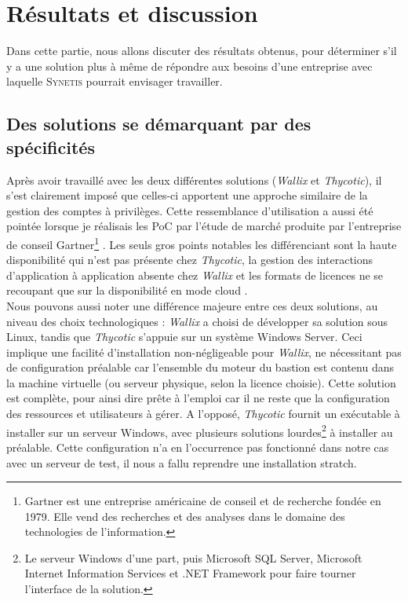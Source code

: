 \section{Résultats et discussion}
\label{sec:resultats}

Dans cette partie, nous allons discuter des résultats obtenus, pour déterminer s'il y a une solution plus à même de répondre aux besoins d'une entreprise avec laquelle \textsc{Synetis} pourrait envisager travailler.

\subsection{Des solutions se démarquant par des spécificités}
\label{subsec:soltaille}

Après avoir travaillé avec les deux différentes solutions (\emph{Wallix} et \emph{Thycotic}), il s'est clairement imposé que celles-ci apportent une approche similaire de la gestion des comptes à privilèges. Cette ressemblance d'utilisation a aussi été pointée lorsque je réalisais les PoC par l'étude de marché produite par l'entreprise de conseil Gartner\footnote{Gartner est une entreprise américaine de conseil et de recherche fondée en 1979. Elle vend des recherches et des analyses dans le domaine des technologies de l'information.} \cite{gar}. Les seuls gros points notables les différenciant sont la haute disponibilité qui n'est pas présente chez \emph{Thycotic}, la gestion des interactions d'application à application absente chez \emph{Wallix} et les formats de licences ne se recoupant que sur la disponibilité en mode \og cloud \fg{}.\\
Nous pouvons aussi noter une différence majeure entre ces deux solutions, au niveau des choix technologiques : \emph{Wallix} a choisi de développer sa solution sous Linux, tandis que \emph{Thycotic} s'appuie sur un système Windows Server. Ceci implique une facilité d'installation non-négligeable pour \emph{Wallix}, ne nécessitant pas de configuration préalable car l'ensemble du moteur du bastion est contenu dans la machine virtuelle (ou serveur physique, selon la licence choisie). Cette solution est complète, pour ainsi dire \og prête à l'emploi \fg{} car il ne reste que la configuration des ressources et utilisateurs à gérer. A l'opposé, \emph{Thycotic} fournit un exécutable à installer sur un serveur Windows, avec plusieurs solutions lourdes\footnote{Le serveur Windows d'une part, puis Microsoft SQL Server, Microsoft Internet Information Services et .NET Framework pour faire tourner l'interface de la solution.} à installer au préalable. Cette configuration n'a en l'occurrence pas fonctionné dans notre cas avec un serveur de test, il nous a fallu reprendre une installation \gls{stratch}.\\
